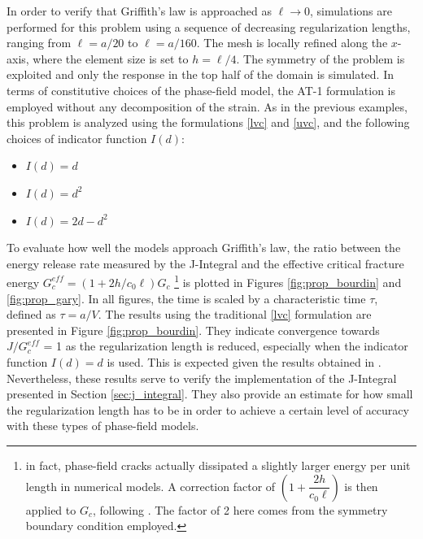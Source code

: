 In order to verify that Griffith's law is approached as $\ell \rightarrow 0$, simulations are performed for this problem using a sequence of decreasing regularization lengths, ranging from $\ell = a/20$ to $\ell = a/160$. The mesh is locally refined along the $x$-axis, where the element size is set to $h = \ell/4$. The symmetry of the problem is exploited and only the response in the top half of the domain is simulated. 
In terms of constitutive choices of the phase-field model, the AT-1 formulation is employed without any decomposition of the strain. 
As in the previous examples, this problem is analyzed using the formulations \eqref{lvc} and \eqref{uvc}, and the following choices of indicator function $I(d)$:
\begin{itemize}
    \item $I(d) = d$
    \item $I(d) = d^2$
    \item $I(d) = 2d-d^2$ 
\end{itemize}

To evaluate how well the models approach Griffith's law, the ratio between the energy release rate measured by the J-Integral and the effective critical fracture energy $G^{eff}_c = (1+2h/c_0\ell) G_c$ \footnote{in fact, phase-field cracks actually dissipated a slightly larger energy per unit length in numerical models. A correction factor of $\left(1+\dfrac{2h}{c_0\ell}\right)$ is then applied to $G_c$, following \cite{yoshioka2020crack}. The factor of 2 here comes from the symmetry boundary condition employed.} is plotted in Figures \ref{fig:prop_bourdin} and \ref{fig:prop_gary}.  In all figures, the time is scaled by a characteristic time $\tau$, defined as $\tau = a/V$. %
The results using the traditional \eqref{lvc} formulation are presented in Figure \ref{fig:prop_bourdin}. They indicate convergence towards $J/G^{eff}_c$ = 1 as the regularization length is reduced, especially when the indicator function $I(d)=d$ is used. This is expected given the results obtained in \cite{bourdin2012variational}. Nevertheless, these results serve to verify the implementation of the J-Integral presented in Section \ref{sec:j_integral}. They also provide an estimate for how small the regularization length has to be in order to achieve a certain level of accuracy with these types of phase-field models.

